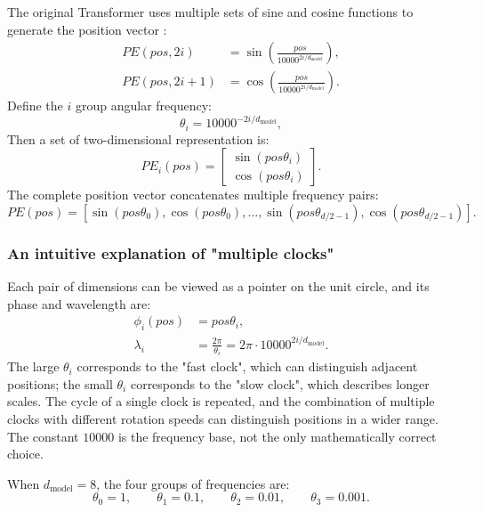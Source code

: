 \documentclass[UTF8,fontset=none,a4paper,10pt]{ctexart}
\begin{document}
The original Transformer uses multiple sets of sine and cosine functions to generate the position vector \cite{vaswani2017}:
\begin{align}
  PE(pos,2i)&=\sin\!\left(\frac{pos}{10000^{2i/d_{\text{model}}}}\right), \label{eq:sin-pe}\\
  PE(pos,2i+1)&=\cos\!\left(\frac{pos}{10000^{2i/d_{\text{model}}}}\right). \label{eq:cos-pe}
\end{align}
Define the $i$ group angular frequency:
\begin{equation}
  \theta_i=10000^{-2i/d_{\text{model}}},
  \label{eq:sin-theta}
\end{equation}
Then a set of two-dimensional representation is:
\begin{equation}
  PE_i(pos)=
  \begin{bmatrix}
    \sin(pos\theta_i)\\
    \cos(pos\theta_i)
  \end{bmatrix}.
  \label{eq:sin-pair}
\end{equation}
The complete position vector concatenates multiple frequency pairs:
\begin{equation}
  PE(pos)=[\sin(pos\theta_0),\cos(pos\theta_0),\ldots,
  \sin(pos\theta_{d/2-1}),\cos(pos\theta_{d/2-1})].
  \label{eq:sin-full}
\end{equation}

\subsubsection{An intuitive explanation of "multiple clocks"}

Each pair of dimensions can be viewed as a pointer on the unit circle, and its phase and wavelength are:
\begin{align}
  \phi_i(pos)&=pos\theta_i, \label{eq:phase}\\
  \lambda_i&=\frac{2\pi}{\theta_i}=2\pi\cdot10000^{2i/d_{\text{model}}}. \label{eq:wavelength}
\end{align}
The large $\theta_i$ corresponds to the "fast clock", which can distinguish adjacent positions; the small $\theta_i$ corresponds to the "slow clock", which describes longer scales. The cycle of a single clock is repeated, and the combination of multiple clocks with different rotation speeds can distinguish positions in a wider range. The constant $10000$ is the frequency base, not the only mathematically correct choice.

When $d_{\text{model}}=8$, the four groups of frequencies are:
\begin{equation}
  \theta_0=1,\qquad \theta_1=0.1,\qquad
  \theta_2=0.01,\qquad \theta_3=0.001.
  \label{eq:d8-frequency}
\end{equation}
\end{document}
